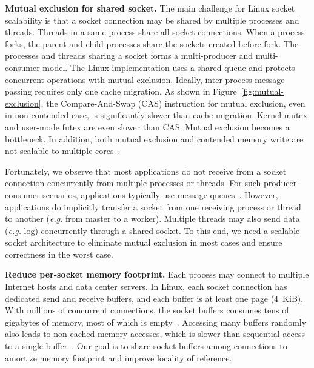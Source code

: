 \textbf{Mutual exclusion for shared socket.}
The main challenge for Linux socket scalability is that a socket connection may be shared by multiple processes and threads. Threads in a same process share all socket connections. When a process forks, the parent and child processes share the sockets created before fork. The processes and threads sharing a socket forms a multi-producer and multi-consumer model. The Linux implementation uses a shared queue and protects concurrent operations with mutual exclusion.
Ideally, inter-process message passing requires only one cache migration. As shown in Figure~\ref{fig:mutual-exclusion}, the Compare-And-Swap (CAS) instruction for mutual exclusion, even in non-contended case, is significantly slower than cache migration. Kernel mutex and user-mode futex are even slower than CAS. Mutual exclusion becomes a bottleneck. In addition, both mutual exclusion and contended memory write are not scalable to multiple cores~\cite{boyd2014optimizing}.

Fortunately, we observe that most applications do not receive from a socket connection concurrently from multiple processes or threads. For such producer-consumer scenarios, applications typically use message queues~\cite{hintjens2013zeromq}. However, applications do implicitly transfer a socket from one receiving process or thread to another (\textit{e.g.} from master to a worker). Multiple threads may also send data (\textit{e.g.} log) concurrently through a shared socket.
To this end, we need a scalable socket architecture to eliminate mutual exclusion in most cases and ensure correctness in the worst case.


\textbf{Reduce per-socket memory footprint.}
Each process may connect to multiple Internet hosts and data center servers. In Linux, each socket connection has dedicated send and receive buffers, and each buffer is at least one page (4~KiB). With millions of concurrent connections, the socket buffers consumes tens of gigabytes of memory, most of which is empty~\cite{lin2016scalable}. Accessing many buffers randomly also leads to non-cached memory accesses, which is slower than sequential access to a single buffer~\cite{li2017kv}. Our goal is to share socket buffers among connections to amortize memory footprint and improve locality of reference.


